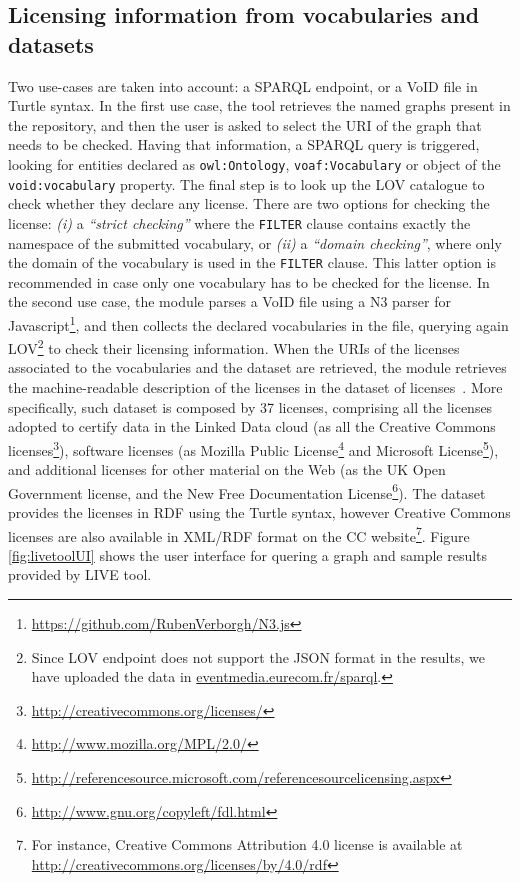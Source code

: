 \subsection{Licensing information from vocabularies and datasets}
Two use-cases are taken into account: a SPARQL endpoint, or a VoID file in Turtle syntax.
In the first use case, the tool retrieves the named graphs present in the repository, and then the user is asked to select the URI of the graph that needs to be checked. Having that information, a SPARQL query is triggered, looking for entities declared as \texttt{owl:Ontology}, \texttt{voaf:Vocabulary} or object  of the \texttt{void:vocabulary} property. The final step is to look up the LOV catalogue to check whether they declare any license. There are two options for checking the license: \textit{(i)} a \textit{``strict checking'' } where the \texttt{FILTER} clause contains exactly the namespace of the submitted vocabulary, or \textit{(ii)} a \textit{``domain checking''}, where only the domain of the vocabulary is used in the \texttt{FILTER} clause. This latter option is recommended in case only one vocabulary has to be checked for the license.
%
In the second use case, the module parses a VoID file using a N3 parser for Javascript\footnote{\url{https://github.com/RubenVerborgh/N3.js}}, and then collects the declared vocabularies in the file, querying again LOV\footnote{Since LOV endpoint does not support the JSON format in the results, we have uploaded the data in \url{eventmedia.eurecom.fr/sparql}.} to check their licensing information.
%
When the URIs of the licenses associated to the vocabularies and the dataset are retrieved, the module retrieves the machine-readable description of the licenses in the dataset of licenses~\cite{CabrioESWC2014}. More specifically, such dataset is composed by 37 licenses, comprising all the licenses adopted to certify data in the Linked Data cloud (as all the Creative Commons licenses\footnote{\url{http://creativecommons.org/licenses/}}), software licenses (as Mozilla Public License\footnote{\url{http://www.mozilla.org/MPL/2.0/}} and Microsoft License\footnote{\url{http://referencesource.microsoft.com/referencesourcelicensing.aspx}}), and additional licenses for other material on the Web (as the UK Open Government license, and the New Free Documentation License\footnote{\url{http://www.gnu.org/copyleft/fdl.html}}). The dataset provides the licenses in RDF using the Turtle syntax, however Creative Commons licenses are also available in XML/RDF format on the CC website\footnote{For instance, Creative Commons Attribution 4.0 license is available at \url{http://creativecommons.org/licenses/by/4.0/rdf}}.
Figure \ref{fig:livetoolUI} shows the user interface for quering a graph and sample results provided by LIVE tool.

